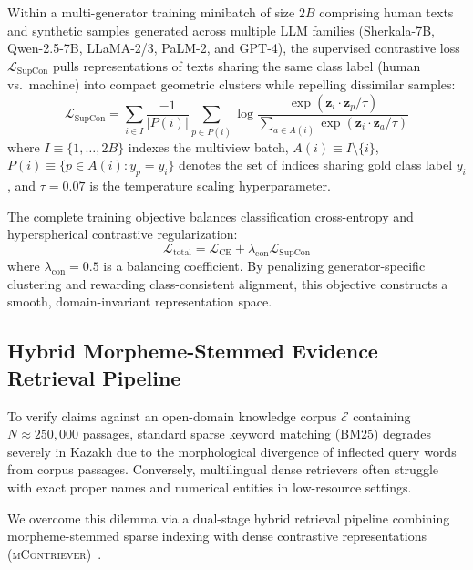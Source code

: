 Within a multi-generator training minibatch of size $2B$ comprising human texts and synthetic samples generated across multiple LLM families (Sherkala-7B, Qwen-2.5-7B, LLaMA-2/3, PaLM-2, and GPT-4), the supervised contrastive loss $\mathcal{L}_{\text{SupCon}}$ pulls representations of texts sharing the same class label (human vs.\ machine) into compact geometric clusters while repelling dissimilar samples:
\begin{equation}
\label{eq:supcon_formula}
\mathcal{L}_{\text{SupCon}} = \sum_{i \in I} \frac{-1}{|P(i)|} \sum_{p \in P(i)} \log \frac{\exp(\mathbf{z}_i \cdot \mathbf{z}_p / \tau)}{\sum_{a \in A(i)} \exp(\mathbf{z}_i \cdot \mathbf{z}_a / \tau)}
\end{equation}
where $I \equiv \{1, \dots, 2B\}$ indexes the multiview batch, $A(i) \equiv I \setminus \{i\}$, $P(i) \equiv \{p \in A(i) : y_p = y_i\}$ denotes the set of indices sharing gold class label $y_i$, and $\tau = 0.07$ is the temperature scaling hyperparameter.

The complete training objective balances classification cross-entropy and hyperspherical contrastive regularization:
\begin{equation}
\label{eq:total_contrastive_loss}
\mathcal{L}_{\text{total}} = \mathcal{L}_{\text{CE}} + \lambda_{\text{con}} \mathcal{L}_{\text{SupCon}}
\end{equation}
where $\lambda_{\text{con}} = 0.5$ is a balancing coefficient. By penalizing generator-specific clustering and rewarding class-consistent alignment, this objective constructs a smooth, domain-invariant representation space.

\subsection{Hybrid Morpheme-Stemmed Evidence Retrieval Pipeline}
\label{sec:hybrid_retrieval}
To verify claims against an open-domain knowledge corpus $\mathcal{E}$ containing $N \approx 250,000$ passages, standard sparse keyword matching (BM25) degrades severely in Kazakh due to the morphological divergence of inflected query words from corpus passages. Conversely, multilingual dense retrievers often struggle with exact proper names and numerical entities in low-resource settings.

We overcome this dilemma via a dual-stage hybrid retrieval pipeline combining morpheme-stemmed sparse indexing with dense contrastive representations (\textsc{mContriever})~\citep{izacard2021contriever}.

